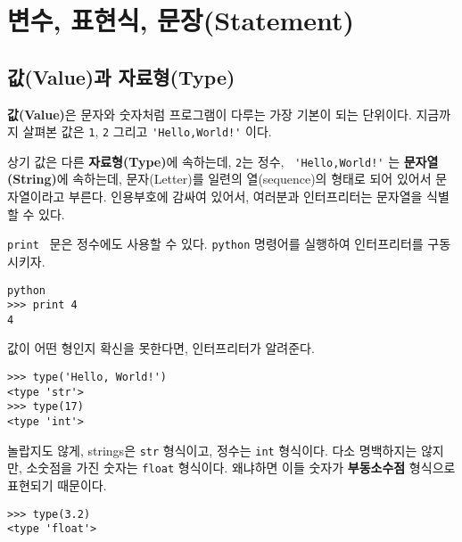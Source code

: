\chapter{변수, 표현식, 문장(Statement)}

\section{값(Value)과 자료형(Type)}

{\bf 값(Value)}은 문자와 숫자처럼 프로그램이 다루는 가장 기본이 되는 단위이다. 
지금까지 살펴본 값은 {\tt 1}, {\tt 2} 그리고 \verb"'Hello,World!'" 이다.

상기 값은 다른 {\bf 자료형(Type)}에 속하는데, {\tt 2}는 정수, \verb" 'Hello,World!'" 는 
{\bf 문자열(String)}에 속하는데, 문자(Letter)를 일련의 열(sequence)의 형태로 되어 있어서 문자열이라고 부른다. 
인용부호에 감싸여 있어서, 여러분과 인터프리터는 문자열을 식별할 수 있다. 

{\tt print } 문은 정수에도 사용할 수 있다. {\tt python} 명령어를 실행하여 인터프리터를 구동시키자.


\beforeverb
\begin{verbatim}
python
>>> print 4
4
\end{verbatim}
\afterverb
%
값이 어떤 형인지 확신을 못한다면, 인터프리터가 알려준다.

\beforeverb
\begin{verbatim}
>>> type('Hello, World!')
<type 'str'>
>>> type(17)
<type 'int'>
\end{verbatim}
\afterverb
%

놀랍지도 않게, strings은 {\tt str} 형식이고, 정수는 {\tt int} 형식이다. 
다소 명백하지는 않지만, 소숫점을 가진 숫자는 {\tt float} 형식이다. 왜냐하면 이들 숫자가 {\bf 부동소수점} 형식으로 표현되기 때문이다.


\beforeverb
\begin{verbatim}
>>> type(3.2)
<type 'float'>
\end{verbatim}
\afterverb
%

